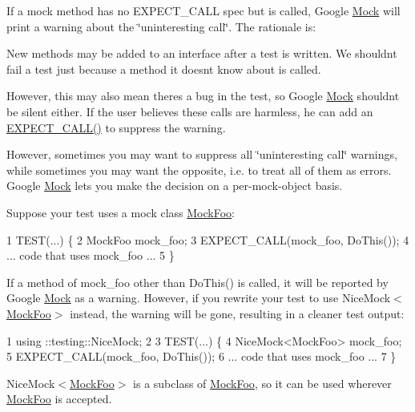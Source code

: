 If a mock method has no {\ttfamily E\+X\+P\+E\+C\+T\+\_\+\+C\+A\+LL} spec but is called, Google \hyperlink{class_mock}{Mock} will print a warning about the \char`\"{}uninteresting call\char`\"{}. The rationale is\+:


\begin{DoxyItemize}
\item New methods may be added to an interface after a test is written. We shouldn\textquotesingle{}t fail a test just because a method it doesn\textquotesingle{}t know about is called.
\item However, this may also mean there\textquotesingle{}s a bug in the test, so Google \hyperlink{class_mock}{Mock} shouldn\textquotesingle{}t be silent either. If the user believes these calls are harmless, he can add an {\ttfamily \hyperlink{gmock-spec-builders_8h_a535a6156de72c1a2e25a127e38ee5232}{E\+X\+P\+E\+C\+T\+\_\+\+C\+A\+L\+L()}} to suppress the warning.
\end{DoxyItemize}

However, sometimes you may want to suppress all \char`\"{}uninteresting call\char`\"{} warnings, while sometimes you may want the opposite, i.\+e. to treat all of them as errors. Google \hyperlink{class_mock}{Mock} lets you make the decision on a per-\/mock-\/object basis.

Suppose your test uses a mock class {\ttfamily \hyperlink{class_mock_foo}{Mock\+Foo}}\+:


\begin{DoxyCode}
1 TEST(...) \{
2   MockFoo mock\_foo;
3   EXPECT\_CALL(mock\_foo, DoThis());
4   ... code that uses mock\_foo ...
5 \}
\end{DoxyCode}


If a method of {\ttfamily mock\+\_\+foo} other than {\ttfamily Do\+This()} is called, it will be reported by Google \hyperlink{class_mock}{Mock} as a warning. However, if you rewrite your test to use {\ttfamily Nice\+Mock$<$\hyperlink{class_mock_foo}{Mock\+Foo}$>$} instead, the warning will be gone, resulting in a cleaner test output\+:


\begin{DoxyCode}
1 using ::testing::NiceMock;
2 
3 TEST(...) \{
4   NiceMock<MockFoo> mock\_foo;
5   EXPECT\_CALL(mock\_foo, DoThis());
6   ... code that uses mock\_foo ...
7 \}
\end{DoxyCode}


{\ttfamily Nice\+Mock$<$\hyperlink{class_mock_foo}{Mock\+Foo}$>$} is a subclass of {\ttfamily \hyperlink{class_mock_foo}{Mock\+Foo}}, so it can be used wherever {\ttfamily \hyperlink{class_mock_foo}{Mock\+Foo}} is accepted.

